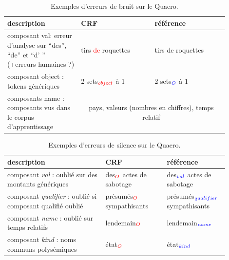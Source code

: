 \documentclass[PhD-Yoann-Dupont.tex]{subfiles}
\begin{document}
\begin{table}[ht!]
\centering
\begin{tabular}{|p{0.3\linewidth}|p{0.3\linewidth}|p{0.3\linewidth}|}
\hline
description                                                 & CRF & référence \\
\hline
composant val: erreur d'analyse sur ``des'', ``de'' et ``d' '' (+erreurs humaines ?) & tirs \textcolor{red}{de} roquettes & tirs de roquettes \\
\hline
composant object : tokens génériques & 2 sets$_{\textcolor{red}{object}}$ à 1 & 2 sets$_{\textcolor{blue}{O}}$ à 1 \\
\hline
composants name : composants vus dans le corpus d'apprentissage & \multicolumn{2}{c|}{pays, valeurs (nombres en chiffres), temps relatif}\\
\hline
\end{tabular}
\caption{Exemples d'erreurs de bruit sur le Quaero.}
\label{tab:component-noise-examples}
\end{table}

\begin{table}[ht!]
\centering
\begin{tabular}{|p{0.4\linewidth}|p{0.25\linewidth}|p{0.25\linewidth}|}
\hline
description                                                        & CRF & référence \\
\hline
composant \textit{val} : oublié sur des montants génériques        & des$_{\textcolor{red}{O}}$ actes de sabotage & des$_{\textcolor{blue}{val}}$ actes de sabotage\\
\hline
composant \textit{qualifier} : oublié si composant qualifié oublié & présumés$_{\textcolor{red}{O}}$ sympathisants & présumés$_{\textcolor{blue}{qualifier}}$ sympathisants \\
\hline
composant \textit{name} : oublié sur temps relatifs                & lendemain$_{\textcolor{red}{O}}$ & lendemain$_{\textcolor{blue}{name}}$ \\
\hline
composant \textit{kind} : noms communs polysémiques                & état$_{\textcolor{red}{O}}$ & état$_{\textcolor{blue}{kind}}$ \\
\hline
\end{tabular}
\caption{Exemples d'erreurs de silence sur le Quaero.}
\label{tab:component-silence-examples}
\end{table}
\end{document}
